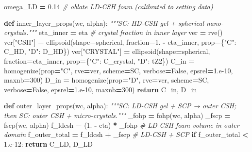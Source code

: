 \documentclass[
  a4paper,
  numbers=noendperiod,
  DIV=12]{scrreprt}
\newenvironment{Shaded}{\begin{snugshade}}{\end{snugshade}}
\newcommand{\CommentTok}[1]{\textcolor[rgb]{0.56,0.35,0.01}{\textit{#1}}}
\newcommand{\ControlFlowTok}[1]{\textcolor[rgb]{0.13,0.29,0.53}{\textbf{#1}}}
\newcommand{\DecValTok}[1]{\textcolor[rgb]{0.00,0.00,0.81}{#1}}
\newcommand{\FloatTok}[1]{\textcolor[rgb]{0.00,0.00,0.81}{#1}}
\newcommand{\KeywordTok}[1]{\textcolor[rgb]{0.13,0.29,0.53}{\textbf{#1}}}
\newcommand{\NormalTok}[1]{#1}
\newcommand{\OperatorTok}[1]{\textcolor[rgb]{0.81,0.36,0.00}{\textbf{#1}}}
\newcommand{\StringTok}[1]{\textcolor[rgb]{0.31,0.60,0.02}{#1}}
\newcommand{\VariableTok}[1]{\textcolor[rgb]{0.00,0.00,0.00}{#1}}
\begin{document}
\begin{Shaded}
\begin{Highlighting}[]
\NormalTok{omega\_LD }\OperatorTok{=} \FloatTok{0.14}    \CommentTok{\# oblate LD{-}CSH foam (calibrated to setting data)}

\KeywordTok{def}\NormalTok{ inner\_layer\_props(wc, alpha):}
    \CommentTok{"""SC: HD{-}CSH gel + spherical nano{-}crystals."""}
\NormalTok{    eta\_inner }\OperatorTok{=}\NormalTok{ eta   }\CommentTok{\# crystal fraction in inner layer}
\NormalTok{    ver }\OperatorTok{=}\NormalTok{ rve()}
\NormalTok{    ver[}\StringTok{"CSH"}\NormalTok{]     }\OperatorTok{=}\NormalTok{ ellipsoid(shape}\OperatorTok{=}\NormalTok{spherical, fraction}\OperatorTok{=}\FloatTok{1.} \OperatorTok{{-}}\NormalTok{ eta\_inner,}
\NormalTok{                               prop}\OperatorTok{=}\NormalTok{\{}\StringTok{"C"}\NormalTok{: C\_HD, }\StringTok{"D"}\NormalTok{: D\_HD\})}
\NormalTok{    ver[}\StringTok{"CRYSTAL"}\NormalTok{] }\OperatorTok{=}\NormalTok{ ellipsoid(shape}\OperatorTok{=}\NormalTok{spherical, fraction}\OperatorTok{=}\NormalTok{eta\_inner,}
\NormalTok{                               prop}\OperatorTok{=}\NormalTok{\{}\StringTok{"C"}\NormalTok{: C\_crystal, }\StringTok{"D"}\NormalTok{: tZ2\})}
\NormalTok{    C\_in }\OperatorTok{=}\NormalTok{ homogenize(prop}\OperatorTok{=}\StringTok{"C"}\NormalTok{, rve}\OperatorTok{=}\NormalTok{ver, scheme}\OperatorTok{=}\NormalTok{SC, verbose}\OperatorTok{=}\VariableTok{False}\NormalTok{,}
\NormalTok{                      epsrel}\OperatorTok{=}\FloatTok{1.e{-}10}\NormalTok{, maxnb}\OperatorTok{=}\DecValTok{300}\NormalTok{)}
\NormalTok{    D\_in }\OperatorTok{=}\NormalTok{ homogenize(prop}\OperatorTok{=}\StringTok{"D"}\NormalTok{, rve}\OperatorTok{=}\NormalTok{ver, scheme}\OperatorTok{=}\NormalTok{SC, verbose}\OperatorTok{=}\VariableTok{False}\NormalTok{,}
\NormalTok{                      epsrel}\OperatorTok{=}\FloatTok{1.e{-}10}\NormalTok{, maxnb}\OperatorTok{=}\DecValTok{300}\NormalTok{)}
    \ControlFlowTok{return}\NormalTok{ C\_in, D\_in}

\KeywordTok{def}\NormalTok{ outer\_layer\_props(wc, alpha):}
    \CommentTok{"""SC: LD{-}CSH gel + SCP → outer CSH; then SC: outer CSH + micro{-}crystals."""}
\NormalTok{    \_fohp }\OperatorTok{=}\NormalTok{ fohp(wc, alpha)}
\NormalTok{    \_fscp }\OperatorTok{=}\NormalTok{ fscp(wc, alpha)}
\NormalTok{    f\_ldcsh }\OperatorTok{=}\NormalTok{ (}\FloatTok{1.} \OperatorTok{{-}}\NormalTok{ eta) }\OperatorTok{*}\NormalTok{ \_fohp        }\CommentTok{\# LD{-}CSH foam volume in outer domain}
\NormalTok{    f\_outer\_total }\OperatorTok{=}\NormalTok{ f\_ldcsh }\OperatorTok{+}\NormalTok{ \_fscp     }\CommentTok{\# LD{-}CSH + SCP}
    \ControlFlowTok{if}\NormalTok{ f\_outer\_total }\OperatorTok{\textless{}} \FloatTok{1.e{-}12}\NormalTok{:}
        \ControlFlowTok{return}\NormalTok{ C\_LD, D\_LD}


\end{Highlighting}
\end{Shaded}
\end{document}
